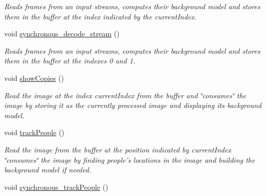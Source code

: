 \begin{DoxyCompactItemize}
\begin{DoxyCompactList}\small\item\em Reads frames from an input streams, computes their background model and stores them in the buffer at the index indicated by the {\ttfamily currentIndex}. \item\end{DoxyCompactList}\item 
\hypertarget{classfindPersonStream_ade2bcd483c68176ec877de1512ea55e6}{
void \hyperlink{classfindPersonStream_ade2bcd483c68176ec877de1512ea55e6}{synchronous\_\-decode\_\-stream} ()}
\label{classfindPersonStream_ade2bcd483c68176ec877de1512ea55e6}

\begin{DoxyCompactList}\small\item\em Reads frames from an input streams, computes their background model and stores them in the buffer at the indexes 0 and 1. \item\end{DoxyCompactList}\item 
\hypertarget{classfindPersonStream_a6f6d1ff94897f3f932c76d532016aa2a}{
void \hyperlink{classfindPersonStream_a6f6d1ff94897f3f932c76d532016aa2a}{showCopies} ()}
\label{classfindPersonStream_a6f6d1ff94897f3f932c76d532016aa2a}

\begin{DoxyCompactList}\small\item\em Read the image at the index {\ttfamily currentIndex} from the buffer and \char`\"{}consumes\char`\"{} the image by storing it as the currently processed image and displaying its background model. \item\end{DoxyCompactList}\item 
\hypertarget{classfindPersonStream_a95f10ceda3a2c431e9f7ef666fcdb33a}{
void \hyperlink{classfindPersonStream_a95f10ceda3a2c431e9f7ef666fcdb33a}{trackPeople} ()}
\label{classfindPersonStream_a95f10ceda3a2c431e9f7ef666fcdb33a}

\begin{DoxyCompactList}\small\item\em Read the image from the buffer at the position indicated by {\ttfamily currentIndex} \char`\"{}consumes\char`\"{} the image by finding people's locations in the image and building the background model if needed. \item\end{DoxyCompactList}\item 
\hypertarget{classfindPersonStream_ab5d313e592f412ed1539af7ee2539bf8}{
void \hyperlink{classfindPersonStream_ab5d313e592f412ed1539af7ee2539bf8}{synchronous\_\-trackPeople} ()}
\label{classfindPersonStream_ab5d313e592f412ed1539af7ee2539bf8}


\end{DoxyCompactItemize}
